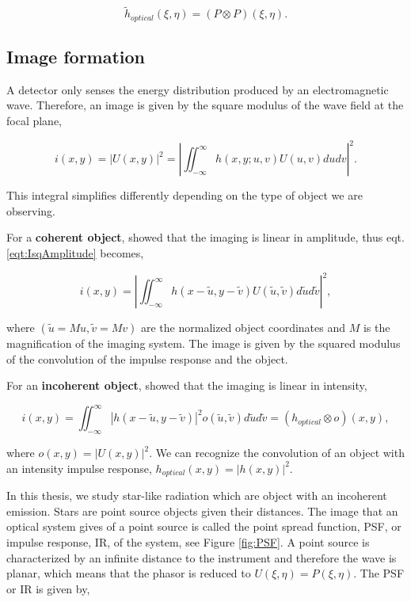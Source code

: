 \begin{equation}
\widetilde{h}_{optical}(\xi,\eta) = (P \otimes P)(\xi,\eta).
\label{eqt:}
\end{equation}


\subsection{Image formation}
\label{subsec:FromOtoI}

A detector only senses the energy distribution produced by an electromagnetic wave. Therefore, an image is given by the square modulus of the wave field at the focal plane,

\begin{equation}
i(x,y) = |U(x,y)|^2 = |\iint_{-\infty}^{\infty} h(x,y;u,v)U(u,v)dudv|^2.
\label{eqt:IsqAmplitude}
\end{equation}

This integral simplifies differently depending on the type of object we are observing. 

For a \textbf{coherent object}, \citet[Chapter 6.2]{goodman_1968} showed that the imaging is linear in amplitude, thus eqt. \eqref{eqt:IsqAmplitude} becomes,

\begin{equation}
i(x,y) = |\iint_{-\infty}^{\infty} h(x-\widetilde{u},y-\widetilde{v})U(\widetilde{u},\widetilde{v})d\widetilde{u}d\widetilde{v}|^2,
\label{eqt:convolution_hUo}
\end{equation}

where $(\widetilde{u} = Mu,\widetilde{v}= Mv)$ are the normalized object coordinates and $M$ is the magnification of the imaging system. The image is given by the squared modulus of the convolution of the impulse response and the object.

For an \textbf{incoherent object},  \citet[Chapter 6.2]{goodman_1968} showed that the imaging is linear in intensity,

\begin{equation}
i(x,y) = \iint_{-\infty}^{\infty}|h(x-\widetilde{u},y-\widetilde{v})|^2o(\widetilde{u},\widetilde{v})d\widetilde{u}d\widetilde{v} = (h_{optical}\otimes o)(x,y),
\label{eqt:imageObjectrel}
\end{equation}

where $o(x,y) = |U(x,y)|^2$. We can recognize the convolution of an object with an intensity impulse response, $h_{optical}(x,y) = |h(x,y)|^2$.

In this thesis, we study star-like radiation which are object with an incoherent emission. Stars are point source objects given their distances. The image that an optical system gives of a point source is called the point spread function, PSF, or impulse response, IR, of the system, see Figure \ref{fig:PSF}. A point source is characterized by an infinite distance to the instrument and therefore the wave is planar, which means that the phasor is reduced to $U(\xi,\eta) = P(\xi,\eta)$. The PSF or IR is given by,

